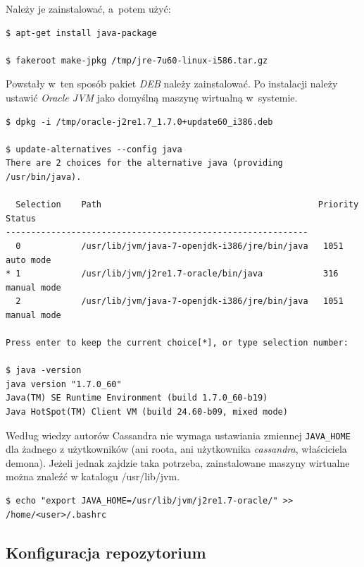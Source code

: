\documentclass{article} %
\begin{document}
Należy je zainstalować, a~potem użyć:

\begin{lstlisting}[style=bash, caption={budowa pakietu DEB z~\emph{Oracle JRE}}]
$ apt-get install java-package

$ fakeroot make-jpkg /tmp/jre-7u60-linux-i586.tar.gz
\end{lstlisting}

Powstały w~ten sposób pakiet \emph{DEB} należy zainstalować.
Po instalacji należy ustawić \emph{Oracle JVM} jako domyślną maszynę wirtualną w~systemie.

\begin{lstlisting}[style=bash, caption={instalacja i konfiguracja \emph{Oracle JRE}}]
$ dpkg -i /tmp/oracle-j2re1.7_1.7.0+update60_i386.deb

$ update-alternatives --config java
There are 2 choices for the alternative java (providing /usr/bin/java).

  Selection    Path                                           Priority   Status
------------------------------------------------------------
  0            /usr/lib/jvm/java-7-openjdk-i386/jre/bin/java   1051      auto mode
* 1            /usr/lib/jvm/j2re1.7-oracle/bin/java            316       manual mode
  2            /usr/lib/jvm/java-7-openjdk-i386/jre/bin/java   1051      manual mode

Press enter to keep the current choice[*], or type selection number:

$ java -version
java version "1.7.0_60"
Java(TM) SE Runtime Environment (build 1.7.0_60-b19)
Java HotSpot(TM) Client VM (build 24.60-b09, mixed mode)
\end{lstlisting}

Według wiedzy autorów Cassandra nie wymaga ustawiania zmiennej \lstinline[style=bash]!JAVA_HOME! dla żadnego z użytkowników (ani roota, ani użytkownika \textit{cassandra}, właściciela demona). Jeżeli jednak zajdzie taka potrzeba, zainstalowane maszyny wirtualne można znaleźć w katalogu /usr/lib/jvm.

\begin{lstlisting}[style=bash, caption={ustawianie JAVA\textunderscore HOME}]
$ echo "export JAVA_HOME=/usr/lib/jvm/j2re1.7-oracle/" >> /home/<user>/.bashrc
\end{lstlisting}

\subsection{Konfiguracja repozytorium}\label{subsec:install_repo}
\end{document}
